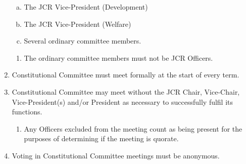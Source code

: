 \documentclass[12pt]{article}  %
\begin{document}
\begin{enumerate}
\begin{enumerate}[(a)]
        \item The JCR Vice-President (Development)
        \item The JCR Vice-President (Welfare)
        \item Several ordinary committee members.
    \end{enumerate}
    \begin{enumerate}
        \item The ordinary committee members must not be JCR Officers.
    \end{enumerate}
    \item Constitutional Committee must meet formally at the start of every term.
    \item Constitutional Committee may meet without the JCR Chair, Vice-Chair, Vice-President(s) and/or President as necessary to successfully fulfil its functions.
    \begin{enumerate}
        \item Any Officers excluded from the meeting count as being present for the purposes of determining if the meeting is quorate.
    \end{enumerate}
    \item Voting in Constitutional Committee meetings must be anonymous.

\end{enumerate}
\end{document}
